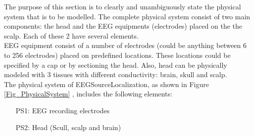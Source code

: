 \documentclass[12pt]{article}
\renewcommand{\progname}{EEGSourceLocalization}
\begin{document}
The purpose of this section is to clearly and unambiguously state the physical system that is to be modelled. The complete physical system consist of two main components: the head and the EEG equipments (electrodes) placed on the the scalp. Each of these 2 have several elements. \\

EEG equipment consist of a number of electrodes (could be anything between 6 to 256 electrodes) placed on predefined locations. These locations could be specified by a cap or by sectioning the head. Also, head can be physically modeled with 3 tissues with different conductivity: brain, skull and scalp.  \\


The physical system of \progname{}, as shown in Figure \ref{Fig_PhysicalSystem} ,
includes the following elements:

\begin{itemize}

\item[PS1:] EEG recording electrodes
\item[PS2:] Head (Scull, scalp and brain)

\end{itemize}

\end{document}
